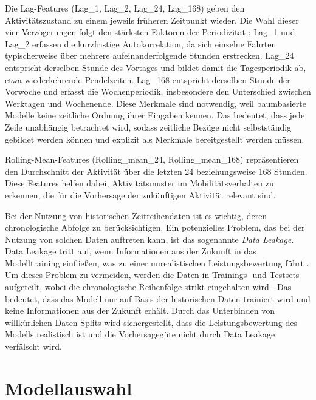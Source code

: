 Die Lag-Features (Lag\_1, Lag\_2, Lag\_24, Lag\_168) geben den Aktivitätszustand zu einem jeweils früheren Zeitpunkt wieder. Die Wahl dieser vier Verzögerungen folgt den stärksten Faktoren der Periodizität \parencite[Kap. 2.8]{hyndman2021forecasting}: Lag\_1 und Lag\_2 erfassen die kurzfristige Autokorrelation, da sich einzelne Fahrten typischerweise über mehrere aufeinanderfolgende Stunden erstrecken. Lag\_24 entspricht derselben Stunde des Vortages und bildet damit die Tagesperiodik ab, etwa wiederkehrende Pendelzeiten. Lag\_168 entspricht derselben Stunde der Vorwoche und erfasst die Wochenperiodik, insbesondere den Unterschied zwischen Werktagen und Wochenende. Diese Merkmale sind notwendig, weil baumbasierte Modelle keine zeitliche Ordnung ihrer Eingaben kennen. Das bedeutet, dass jede Zeile unabhängig betrachtet wird, sodass zeitliche Bezüge nicht selbstständig gebildet werden können und explizit als Merkmale bereitgestellt werden müssen.

Rolling-Mean-Features (Rolling\_mean\_24, Rolling\_mean\_168) repräsentieren den Durchschnitt der Aktivität über die letzten 24 beziehungsweise 168 Stunden. Diese Features helfen dabei, Aktivitätsmuster im Mobilitätsverhalten zu erkennen, die für die Vorhersage der zukünftigen Aktivität relevant sind. 

Bei der Nutzung von historischen Zeitreihendaten ist es wichtig, deren chronologische Abfolge zu berücksichtigen. Ein potenzielles Problem, das bei der Nutzung von solchen Daten auftreten kann, ist das sogenannte \emph{Data Leakage}. Data Leakage tritt auf, wenn Informationen aus der Zukunft in das Modelltraining einfließen, was zu einer unrealistischen Leistungsbewertung führt \parencite{kaufman2012leakage}. Um dieses Problem zu vermeiden, werden die Daten in Trainings- und Testsets aufgeteilt, wobei die chronologische Reihenfolge strikt eingehalten wird \parencite{tashman2000outofsample}. Das bedeutet, dass das Modell nur auf Basis der historischen Daten trainiert wird und keine Informationen aus der Zukunft erhält. Durch das Unterbinden von willkürlichen Daten-Splits wird sichergestellt, dass die Leistungsbewertung des Modells realistisch ist und die Vorhersagegüte nicht durch Data Leakage verfälscht wird.


\section{Modellauswahl}
\label{sec:modellauswahl}

